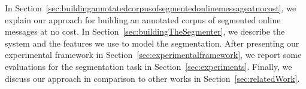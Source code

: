 %



In Section~\ref{sec:buildingannotatedcorpusofsegmentedonlinemessageatnocost}, we explain our approach for building an annotated corpus of segmented online messages at no cost. 
In Section~\ref{sec:buildingTheSegmenter}, we describe the  system and the features we use to model the segmentation. 
After presenting our experimental framework in Section~\ref{sec:experimentalframework}, we report some evaluations for the segmentation task in Section~\ref{sec:experiments}. 
Finally, we discuss our approach in comparison to other works in Section~\ref{sec:relatedWork}.



